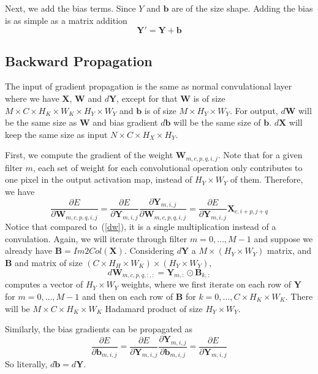 \documentclass[authordraft=true,dvipsnames]{acmart}
\newcommand{\pref}[1]{(\ref{#1})}
\newcommand{\bx}[0]{\mathbf{X}}
\newcommand{\bw}[0]{\mathbf{W}}
\newcommand{\by}[0]{\mathbf{Y}}
\newcommand{\bb}[0]{\mathbf{B}}
\begin{document}
Next, we add the bias terms. Since $Y$ and $\mathbf{b}$ are of the size shape. Adding the bias is as simple as a matrix addition
\begin{equation}
\by' = \by + \mathbf{b}
\end{equation}

\subsection{Backward Propagation}
The input of gradient propagation is the same as normal convulational layer where we have $\bx$, $\bw$ and $d\by$, except for that $\bw$ is of size $M  \times C \times H_K \times W_K\times H_Y \times W_Y$ and $\mathbf{b}$ is of size $M \times H_Y \times W_Y$. For output, $d\bw$ will be the same size as $\bw$ and bias gradient $d\mathbf{b}$ will be the same size of $\mathbf{b}$. $d\bx$ will keep the same size as input $N \times C \times H_X \times H_Y$.

First, we compute the gradient of the weight $\bw_{m,c,p,q,i,j}$. Note that for a given filter $m$, each set of weight for each convolutional operation only contributes to one pixel in the output activation map, instead of $H_Y \times W_Y$ of them. Therefore, we have
\begin{equation}
\frac{\partial E}{\partial \bw_{m,c,p,q,i,j}} = \frac{\partial E}{\partial \by_{m,i,j}} \frac{\partial \by_{m,i,j}}{\partial  \bw_{m,c,p,q,i,j}} =  \frac{\partial E}{\partial \by_{m,i,j}} \bx_{c,i+p,j+q}
\end{equation}
Notice that compared to~\pref{dw}, it is a single multiplication instead of a convulation. Again, we will iterate through filter $m=0,\ldots,M-1$ and suppose we already have $\bb=Im2Col(\bx)$. Considering $d\by$ a $M \times (H_Y \times W_Y)$ matrix, and $\mathbf{B}$ and matrix of size $(C \times H_H \times W_K) \times (H_Y \times W_Y)$,  
\begin{equation*}
d\bw_{m,c,p,q,:,:} = \by_{m,:} \odot \bb_{k,:}
\end{equation*}
computes a vector of $H_Y \times W_Y$ weights, where we first iterate on each row of $\by$ for $m=0,\ldots,M-1$ and then on each row of $\bb$ for $k=0,\ldots,C\times H_K \times W_K$. There will be $M \times C \times H_K \times W_K$ Hadamard product of size $H_Y \times W_Y$. 

 
Similarly, the bias gradients can be propagated as 
\begin{equation}
\frac{\partial E}{\partial \mathbf{b}_{m,i,j}} = \frac{\partial E} {\partial \by_{m,i,j}} \frac{\partial \by_{m,i,j}} {\partial \mathbf{b}_{m,i,j}} = \frac{\partial E} {\partial \by_{m,i,j}} 
\end{equation}
So literally, $d\mathbf{b}=d\by$.
\end{document}
